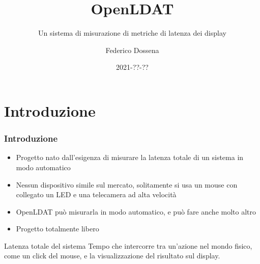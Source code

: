 \documentclass[xcolor={dvipsnames}]{beamer}
\title{OpenLDAT}
\subtitle{Un sistema di misurazione di metriche di latenza dei display}
\author{Federico Dossena}
\institute{Università degli Studi di Milano}
\date{2021-??-??}
\begin{document}
	
\begin{frame}
	\titlepage
\end{frame}

\section{Introduzione}
\begin{frame}
	\frametitle{Introduzione}
	\begin{itemize}
		\item Progetto nato dall'esigenza di \alert{misurare la latenza totale di un sistema} in modo automatico
		\item \alert{Nessun dispositivo simile sul mercato}, solitamente si usa un mouse con collegato un LED e una telecamera ad alta velocità
		\item \alert{OpenLDAT può misurarla in modo automatico}, e può fare anche molto altro
		\item Progetto totalmente \alert{libero}
	\end{itemize}
	\begin{block}{Latenza totale del sistema}
		Tempo che intercorre tra un'azione nel mondo fisico, come un click del mouse, e la visualizzazione del risultato sul display.
	\end{block}
\end{frame}
\end{document}
